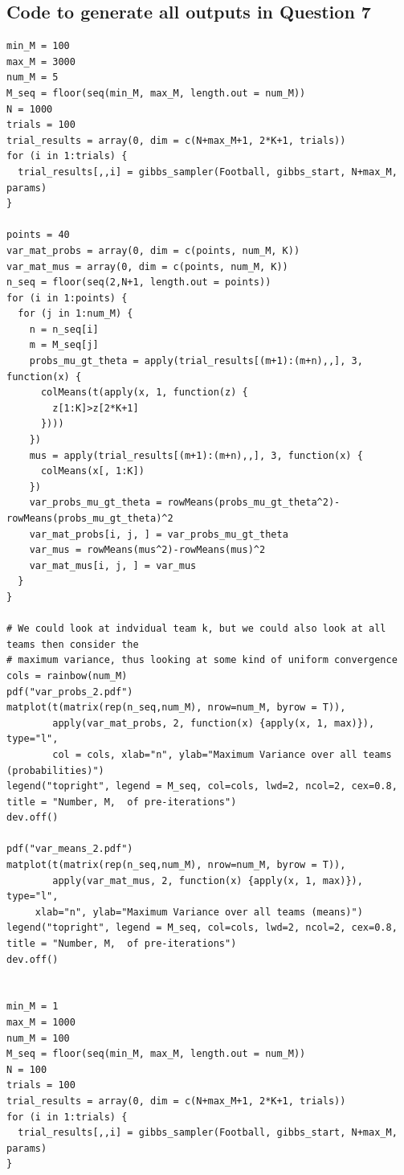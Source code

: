 \documentclass[11pt]{article} %
\begin{document}
\subsection*{Code to generate all outputs in Question 7}
\begin{lstlisting}
min_M = 100
max_M = 3000
num_M = 5
M_seq = floor(seq(min_M, max_M, length.out = num_M))
N = 1000
trials = 100
trial_results = array(0, dim = c(N+max_M+1, 2*K+1, trials))
for (i in 1:trials) {
  trial_results[,,i] = gibbs_sampler(Football, gibbs_start, N+max_M, params)
}

points = 40
var_mat_probs = array(0, dim = c(points, num_M, K))
var_mat_mus = array(0, dim = c(points, num_M, K))
n_seq = floor(seq(2,N+1, length.out = points))
for (i in 1:points) {
  for (j in 1:num_M) {
    n = n_seq[i]
    m = M_seq[j]
    probs_mu_gt_theta = apply(trial_results[(m+1):(m+n),,], 3, function(x) {
      colMeans(t(apply(x, 1, function(z) {
        z[1:K]>z[2*K+1]
      })))
    })
    mus = apply(trial_results[(m+1):(m+n),,], 3, function(x) {
      colMeans(x[, 1:K])
    })
    var_probs_mu_gt_theta = rowMeans(probs_mu_gt_theta^2)-rowMeans(probs_mu_gt_theta)^2
    var_mat_probs[i, j, ] = var_probs_mu_gt_theta
    var_mus = rowMeans(mus^2)-rowMeans(mus)^2
    var_mat_mus[i, j, ] = var_mus
  }
}

# We could look at indvidual team k, but we could also look at all teams then consider the 
# maximum variance, thus looking at some kind of uniform convergence
cols = rainbow(num_M)
pdf("var_probs_2.pdf")
matplot(t(matrix(rep(n_seq,num_M), nrow=num_M, byrow = T)), 
        apply(var_mat_probs, 2, function(x) {apply(x, 1, max)}), type="l",
        col = cols, xlab="n", ylab="Maximum Variance over all teams (probabilities)")
legend("topright", legend = M_seq, col=cols, lwd=2, ncol=2, cex=0.8, title = "Number, M,  of pre-iterations")
dev.off()

pdf("var_means_2.pdf")
matplot(t(matrix(rep(n_seq,num_M), nrow=num_M, byrow = T)), 
        apply(var_mat_mus, 2, function(x) {apply(x, 1, max)}), type="l",
     xlab="n", ylab="Maximum Variance over all teams (means)")
legend("topright", legend = M_seq, col=cols, lwd=2, ncol=2, cex=0.8, title = "Number, M,  of pre-iterations")
dev.off()


min_M = 1
max_M = 1000
num_M = 100
M_seq = floor(seq(min_M, max_M, length.out = num_M))
N = 100
trials = 100
trial_results = array(0, dim = c(N+max_M+1, 2*K+1, trials))
for (i in 1:trials) {
  trial_results[,,i] = gibbs_sampler(Football, gibbs_start, N+max_M, params)
}


\end{lstlisting}
\end{document}

